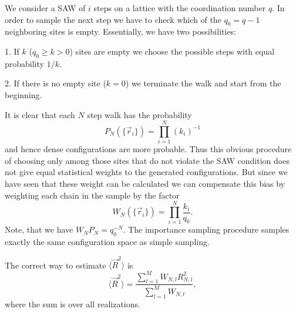We consider a SAW of $i$ steps on a lattice with the coordination 
number $q$. In order to sample the next step we have to check  
which of the $q_0 = q-1$ neighboring sites is empty. Essentially,
we have two possibilities:

1. If $k$ ($q_0 \ge k >0$) sites are empty we choose the possible 
steps with equal probability $1/k$.

2. If there is no empty site ($k=0$) we terminate the walk and 
start from the beginning.

It is clear that each $N$ step walk has the probability
\begin{equation*}
P_N(\{ \vec{r}_i \}) = \prod_{i=1}^N (k_i)^{-1}
\end{equation*}
and hence dense configurations are more probable. Thus this 
obvious procedure of choosing only among those  sites that do not 
violate the SAW condition does not give equal statistical weights
to the generated configurations. But since we have seen that these 
weight can be calculated we can compensate this bias by weighting 
each chain in the sample by the factor
\begin{equation*}
W_N(\{ \vec{r}_i \}) =  \prod_{i=1}^N \frac{k_i}{q_0}.
\end{equation*}
Note, that we have $W_N P_N = q_0^{-N}$. The importance 
sampling procedure samples 
exactly the same configuration space as simple sampling.

The correct way to estimate $\langle \vec{R}^2 \rangle$ is
\begin{equation*}
\langle \vec{R}^2 \rangle = \frac{\sum_{l=1}^M W_{N,l} R^2_{N,l}}
                               {\sum_{l=1}^M W_{N,l}},
\end{equation*}
where the sum is over all realizations.

